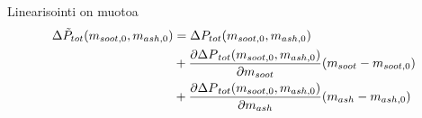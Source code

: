 Linearisointi on muotoa
\begin{align}
    \begin{split}
    \Delta\tilde{ P}_{tot}(m_{soot, 0}, m_{ash, 0}) &= \Delta P_{tot}(m_{soot, 0}, m_{ash, 0})
    \\ &+
    \frac{\partial {\Delta P}_{tot}(m_{soot, 0}, m_{ash, 0})}{\partial m_{soot}} (m_{soot} - m_{soot,0}) 
    \\ &+ 
    \frac{\partial {\Delta P}_{tot}(m_{soot, 0}, m_{ash, 0})}{\partial m_{ash}}  (m_{ash} - m_{ash,0})
\end{split}
\end{align}





